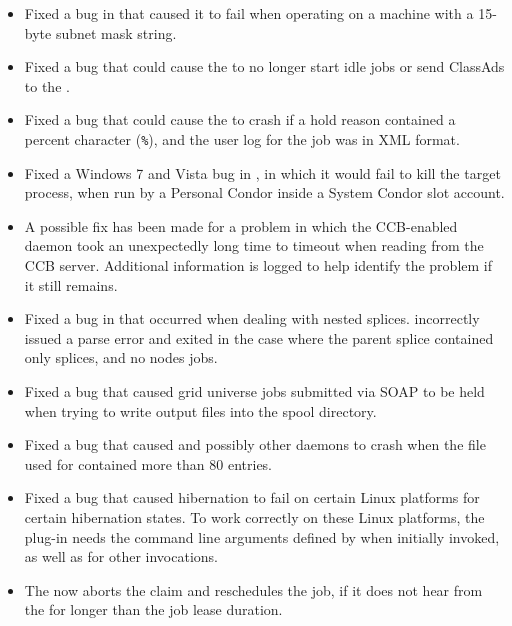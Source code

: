\begin{itemize}
\item Fixed a bug in  that caused it to fail when
operating on a machine with a 15-byte subnet mask string.

\item Fixed a bug that could cause the  to no longer start
idle jobs or send ClassAds to the .

\item Fixed a bug that could cause the  to crash if a
hold reason contained a percent character (\verb|%|),
and the user log for the job was in XML format.

\item Fixed a Windows 7 and Vista bug in ,
in which it would fail to kill the target process,
when run by a Personal Condor inside a System Condor slot account.

\item A possible fix has been made for a problem in which the
CCB-enabled daemon took an unexpectedly long time to timeout when
reading from the CCB server.  Additional information is logged
to help identify the problem if it still remains.

\item Fixed a bug in  that occurred when 
dealing with nested splices.
 incorrectly issued a parse error and exited
in the case where the parent splice contained only splices, and no nodes jobs.

\item Fixed a bug that caused grid universe jobs submitted via SOAP to
be held when trying to write output files into the spool directory.

\item Fixed a bug that caused  and possibly other
daemons to crash when the file used for 
contained more than 80 entries.

\item Fixed a bug that caused hibernation to fail on certain Linux platforms
for certain hibernation states.
To work correctly on these Linux platforms,
the plug-in needs the command line arguments defined by
 when initially invoked, 
as well as for other invocations.  

\item The  now aborts the claim and reschedules the job,
if it does not hear from the  for longer than the job
lease duration.

\end{itemize}

